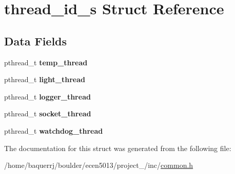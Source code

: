 \hypertarget{structthread__id__s}{}\section{thread\+\_\+id\+\_\+s Struct Reference}
\label{structthread__id__s}
\subsection*{Data Fields}
\begin{DoxyCompactItemize}
\item 
\mbox{\label{structthread__id__s_a07a826a45bc125dc959a56d1c851624b}} 
pthread\+\_\+t {\bfseries temp\+\_\+thread}
\item 
\mbox{\label{structthread__id__s_a24c72a48963b59d8351a212d404987e2}} 
pthread\+\_\+t {\bfseries light\+\_\+thread}
\item 
\mbox{\label{structthread__id__s_aca576cfeda8f282d6445e5befad47817}} 
pthread\+\_\+t {\bfseries logger\+\_\+thread}
\item 
\mbox{\label{structthread__id__s_a6dd6e83a0a8a0f836c4559f3d0b4cf1f}} 
pthread\+\_\+t {\bfseries socket\+\_\+thread}
\item 
\mbox{\label{structthread__id__s_a10f7681a2b1198f763eca9c7e4972048}} 
pthread\+\_\+t {\bfseries watchdog\+\_\+thread}
\end{DoxyCompactItemize}


The documentation for this struct was generated from the following file\+:\begin{DoxyCompactItemize}
\item 
/home/baquerrj/boulder/ecen5013/project\+\_/inc/\hyperlink{common_8h}{common.\+h}\end{DoxyCompactItemize}
